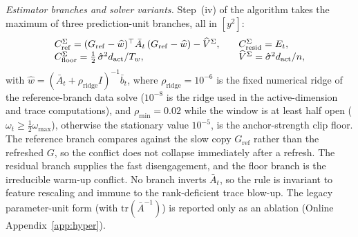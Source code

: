 \documentclass[twoside,11pt]{article}
\newcounter{algorithm}
\begin{document}
\emph{Estimator branches and solver variants.}
Step~(iv) of the algorithm takes the maximum of three prediction-unit branches, all in $[y^2]$:
\[
\begin{array}{@{}l@{\qquad}l@{}}
C^\Sigma_{\mathrm{ref}} = (G_{\mathrm{ref}} - \widehat w)^\top \bar A_t\,(G_{\mathrm{ref}} - \widehat w) - \widehat V^\Sigma, & C^\Sigma_{\mathrm{resid}} = E_t, \\
C^\Sigma_{\mathrm{floor}} = \tfrac12\,\hat\sigma^2 d_{\mathrm{act}}/T_w, & \widehat V^\Sigma = \hat\sigma^2 d_{\mathrm{act}}/n,
\end{array}
\]
with $\widehat w = (\bar A_t + \rho_{\mathrm{ridge}} I)^{-1}\bar b_t$, where $\rho_{\mathrm{ridge}} = 10^{-6}$ is the fixed numerical ridge of the reference-branch data solve ($10^{-8}$ is the ridge used in the active-dimension and trace computations), and $\rho_{\min} = 0.02$ while the window is at least half open ($\omega_t \ge \tfrac12\omega_{\max}$), otherwise the stationary value $10^{-5}$, is the anchor-strength clip floor.
The reference branch compares against the slow copy $G_{\mathrm{ref}}$ rather than the refreshed $G$, so the conflict does not collapse immediately after a refresh. The residual branch supplies the fast disengagement, and the floor branch is the irreducible warm-up conflict.
No branch inverts $\bar A_t$, so the rule is invariant to feature rescaling and immune to the rank-deficient trace blow-up.
The legacy parameter-unit form (with $\mathrm{tr}(\bar A^{-1})$) is reported only as an ablation (Online Appendix~\ref{app:hyper}).
\end{document}
